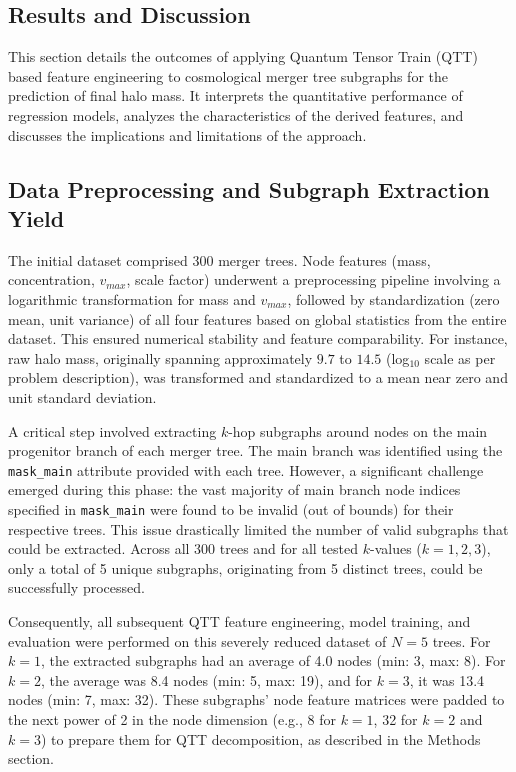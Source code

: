\documentclass[twocolumn]{aastex631}
\begin{document}
\subsection{Results and Discussion}

This section details the outcomes of applying Quantum Tensor Train (QTT) based feature engineering to cosmological merger tree subgraphs for the prediction of final halo mass. It interprets the quantitative performance of regression models, analyzes the characteristics of the derived features, and discusses the implications and limitations of the approach.

\subsection{Data Preprocessing and Subgraph Extraction Yield}

The initial dataset comprised 300 merger trees. Node features (mass, concentration, $v_{max}$, scale factor) underwent a preprocessing pipeline involving a logarithmic transformation for mass and $v_{max}$, followed by standardization (zero mean, unit variance) of all four features based on global statistics from the entire dataset. This ensured numerical stability and feature comparability. For instance, raw halo mass, originally spanning approximately $9.7$ to $14.5$ (log$_{10}$ scale as per problem description), was transformed and standardized to a mean near zero and unit standard deviation.

A critical step involved extracting $k$-hop subgraphs around nodes on the main progenitor branch of each merger tree. The main branch was identified using the \texttt{mask\_main} attribute provided with each tree. However, a significant challenge emerged during this phase: the vast majority of main branch node indices specified in \texttt{mask\_main} were found to be invalid (out of bounds) for their respective trees. This issue drastically limited the number of valid subgraphs that could be extracted. Across all 300 trees and for all tested $k$-values ($k=1, 2, 3$), only a total of 5 unique subgraphs, originating from 5 distinct trees, could be successfully processed.

Consequently, all subsequent QTT feature engineering, model training, and evaluation were performed on this severely reduced dataset of $N=5$ trees. For $k=1$, the extracted subgraphs had an average of 4.0 nodes (min: 3, max: 8). For $k=2$, the average was 8.4 nodes (min: 5, max: 19), and for $k=3$, it was 13.4 nodes (min: 7, max: 32). These subgraphs' node feature matrices were padded to the next power of 2 in the node dimension (e.g., 8 for $k=1$, 32 for $k=2$ and $k=3$) to prepare them for QTT decomposition, as described in the Methods section.
\end{document}
